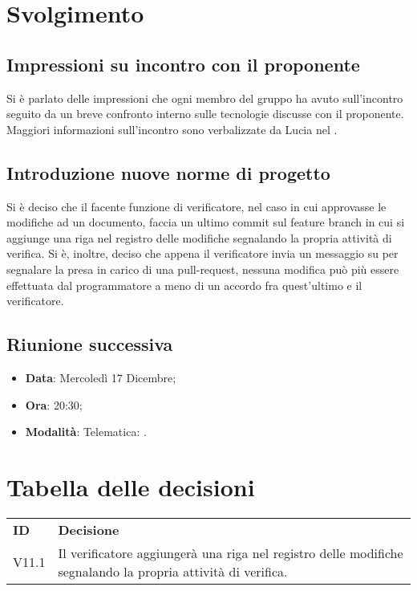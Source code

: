 \documentclass[]{article}
\begin{document}
	\newpage

	\section{Svolgimento}
		\subsection{Impressioni su incontro con il proponente}
		Si è parlato delle impressioni che ogni membro del gruppo ha avuto sull'incontro seguito da un breve confronto interno sulle tecnologie discusse con il proponente. Maggiori informazioni sull'incontro sono verbalizzate da Lucia nel .\\

		\subsection{Introduzione nuove norme di progetto}
		Si è deciso che il facente funzione di verificatore, nel caso in cui approvasse le modifiche ad un documento, faccia un ultimo commit sul feature branch in cui si aggiunge una riga nel registro delle modifiche segnalando la propria attività di verifica.
		Si è, inoltre, deciso che appena il verificatore invia un messaggio su  per segnalare la presa in carico di una pull-request, nessuna modifica può più essere effettuata dal programmatore a meno di un accordo fra quest'ultimo e il verificatore.\\

		\subsection{Riunione successiva}
		\begin{itemize}
			\item \textbf{Data}: Mercoledì 17 Dicembre;
			\item \textbf{Ora}: 20:30;
			\item \textbf{Modalità}: Telematica: .
		\end{itemize}
	
	\newpage
	
	\section{Tabella delle decisioni}
	
	\begin{table} [h!]
		\begin{center}
			\begin{tabular} { m{2cm} m{14cm} }
				\rowcolor{lightgray}
				\textbf{ID} & \textbf{Decisione}\\
				V11.1 & Il verificatore aggiungerà una riga nel registro delle modifiche segnalando la propria attività di verifica.
			\end{tabular}
		\end{center}
	\end{table}
\end{document}
